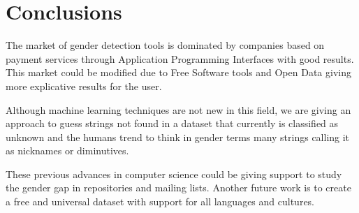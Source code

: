 \documentclass[a4paper]{article}
\begin{document}
\section*{Conclusions}

The market of gender detection tools is dominated by companies based
on payment services through Application Programming Interfaces with
good results. This market could be modified due to Free Software
tools and Open Data giving more explicative results for the user.

Although machine learning techniques are not new in this field, we
are giving an approach to guess strings not found in a dataset that
currently is classified as unknown and the humans trend to think in
gender terms many strings calling it as nicknames or diminutives.

These previous advances in computer science could be giving support to
study the gender gap in repositories and mailing lists. Another future
work is to create a free and universal dataset with support for all
languages and cultures.
\end{document}
